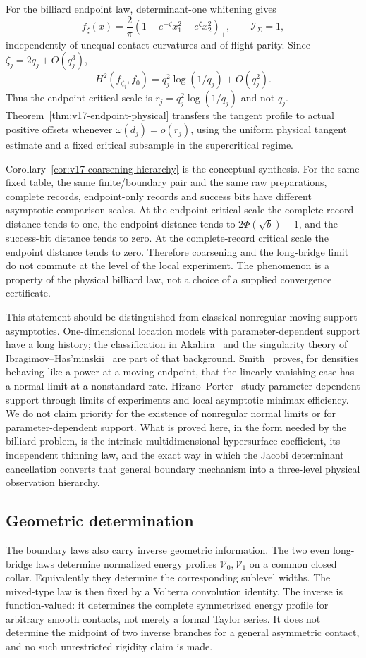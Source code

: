 For the billiard endpoint law, determinant-one whitening gives
\[
 f_\zeta(x)=\frac2\pi
 (1-e^{-\zeta}x_1^2-e^{\zeta}x_2^2)_+,
 \qquad \mathcal I_\Sigma=1,
\]
independently of unequal contact curvatures and of flight parity.  Since
$\zeta_j=2q_j+O(q_j^3)$,
\[
 H^2(f_{\zeta_j},f_0)
       =q_j^2\log(1/q_j)+O(q_j^2).
\]
Thus the endpoint critical scale is
$r_j=q_j^2\log(1/q_j)$ and not $q_j$.  Theorem~\ref{thm:v17-endpoint-physical}
transfers the tangent profile to actual positive offsets whenever
$\omega(d_j)=o(r_j)$, using the uniform physical tangent estimate and a
fixed critical subsample in the supercritical regime.

Corollary~\ref{cor:v17-coarsening-hierarchy} is the conceptual synthesis.
For the same fixed table, the same finite/boundary pair and the same raw
preparations, complete records, endpoint-only records and success bits
have different asymptotic comparison scales.  At the endpoint critical
scale the complete-record distance tends to one, the endpoint distance
tends to $2\Phi(\sqrt b)-1$, and the success-bit distance tends to zero.
At the complete-record critical scale the endpoint distance tends to zero.
Therefore coarsening and the long-bridge limit do not commute at the level
of the local experiment.  The phenomenon is a property of the physical
billiard law, not a choice of a supplied convergence certificate.

This statement should be distinguished from classical nonregular
moving-support asymptotics.  One-dimensional location models with
parameter-dependent support have a long history; the classification in
Akahira~\cite{Akahira1975a,Akahira1975b} and the singularity theory of
Ibragimov--Has'minskii~\cite{IbragimovHasminskii} are part of that
background.  Smith~\cite{Smith1985} proves, for densities behaving like a
power at a moving endpoint, that the linearly vanishing case has a normal
limit at a nonstandard rate.  Hirano--Porter~\cite{HiranoPorter} study
parameter-dependent support through limits of experiments and local
asymptotic minimax efficiency.  We do not claim priority for the existence
of nonregular normal limits or for parameter-dependent support.  What is
proved here, in the form needed by the billiard problem, is the intrinsic
multidimensional hypersurface coefficient, its independent thinning law,
and the exact way in which the Jacobi determinant cancellation converts
that general boundary mechanism into a three-level physical observation
hierarchy.

\subsection{Geometric determination}
The boundary laws also carry inverse geometric information.  The two
even long-bridge laws determine normalized energy profiles
$\mathcal V_0,\mathcal V_1$ on a common closed collar.  Equivalently they
determine the corresponding sublevel widths.  The mixed-type law is then
fixed by a Volterra convolution identity.  The inverse is function-valued:
it determines the complete symmetrized energy profile for arbitrary smooth
contacts, not merely a formal Taylor series.  It does not determine the
midpoint of two inverse branches for a general asymmetric contact, and no
such unrestricted rigidity claim is made.

